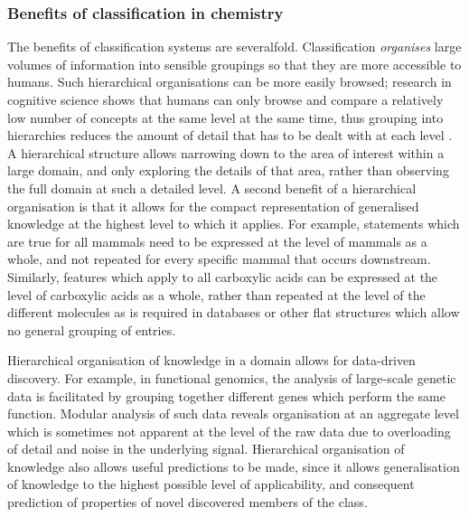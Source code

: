 \documentclass[10pt]{bmc_article}
\newenvironment{bmcformat}{\baselineskip20pt\sloppy\setboolean{publ}{false}}{\baselineskip20pt\sloppy}
\begin{document}
\begin{bmcformat}
\subsubsection*{Benefits of classification in chemistry}
The benefits of classification systems are severalfold. Classification \textit{organises} large volumes of information into sensible groupings so that they are more accessible to humans. Such hierarchical organisations can be more easily browsed; research in cognitive science shows that humans can only browse and compare a relatively low number of concepts at the same level at the same time, thus grouping into hierarchies reduces the amount of detail that has to be dealt with at each level \cite{sternberg2003}. A hierarchical structure allows  narrowing down to the area of interest within a large domain, and only exploring the details of that area, rather than observing the full domain at such a detailed level. A second benefit of a hierarchical organisation is that it allows for the compact representation of generalised knowledge at the highest level to which it applies.  For example, statements which are true for all mammals need to be expressed at the level of mammals as a whole, and not repeated for every specific mammal that occurs downstream.  Similarly, features which apply to all carboxylic acids can be expressed at the level of carboxylic acids as a whole, rather than repeated at the level of the different molecules as is required in databases or other flat structures which allow no general grouping of entries. 

Hierarchical organisation of knowledge in a domain allows for data-driven discovery. For example, in functional genomics, the analysis of large-scale genetic data is facilitated by grouping together different genes which perform the same function. Modular analysis of such data reveals organisation at an aggregate level which is sometimes not apparent at the level of the raw data due to overloading of detail and noise in the underlying signal. %
Hierarchical organisation of knowledge also allows useful predictions to be made, since it allows generalisation of knowledge to the highest possible level of applicability, and consequent prediction of properties of novel discovered members of the class.  


\end{bmcformat}
\end{document}
